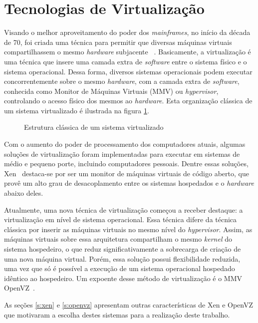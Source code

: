 \documentclass[12pt]{article}
\def\sw{\textit{software}\xspace}
\def\hw{\textit{hardware}\xspace}
\def\hvisor{\textit{hypervisor}\xspace}
\begin{document}
\section{Tecnologias de Virtualização}\label{s:tecnologias}

Visando o melhor aproveitamento do poder dos \textit{mainframes}, no início da década de 70, foi criada uma técnica para permitir que diversas máquinas virtuais compartilhassem o mesmo \hw subjacente ~\cite{Goldberg}. Basicamente, a virtualização é uma técnica que insere uma camada extra de \sw entre o sistema físico e o sistema operacional. Dessa forma, diversos sistemas operacionais podem executar concorrentemente sobre o mesmo \hw, com a camada extra de \sw, conhecida como Monitor de Máquinas Virtuais (MMV) ou \hvisor, controlando o acesso físico dos mesmos ao \hw. Esta organização clássica de um sistema virtualizado é ilustrada na figura \ref{fig:virtualizacao}.


\begin{figure}[!htb]
\centering
{}
\caption{Estrutura clássica de um sistema virtualizado}
\label{fig:virtualizacao}
\end{figure}


Com o aumento do poder de processamento dos computadores atuais, algumas soluções de virtualização foram implementadas para executar em sistemas de médio e pequeno porte, incluindo computadores pessoais. Dentre essas soluções, Xen~\cite{xen} destaca-se por ser um monitor de máquinas virtuais de código aberto, que provê um alto grau de desacoplamento entre os sistemas hospedados e o \hw abaixo deles.

Atualmente, uma nova técnica de virtualização começou a receber destaque: a virtualização em nível de sistema operacional. Essa técnica difere da técnica clássica por inserir as máquinas virtuais no mesmo nível do \hvisor. Assim, as máquinas virtuais sobre essa arquitetura compartilham o mesmo \emph{kernel} do sistema hospedeiro, o que reduz significativamente a sobrecarga de criação de uma nova máquina virtual. Porém, essa solução possui flexibilidade reduzida, uma vez que só é possível a execução de um sistema operacional hospedado idêntico ao hospedeiro. Um expoente desse método de virtualização é o MMV OpenVZ~\cite{openvz}.

As seções \ref{s:xen} e \ref{s:openvz} apresentam outras características de Xen e OpenVZ que motivaram a escolha destes sistemas para a realização deste trabalho.
\end{document}

